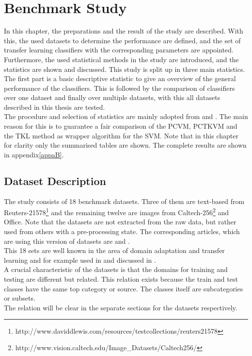 \chapter{Benchmark Study}\label{EmChap}
In this chapter, the preparations and the result of the study are described.
With this, the used datasets to determine the performance are defined, and the set of transfer learning classifiers with the corresponding parameters are appointed.\\
Furthermore, the used statistical methods in the study are introduced, and the statistics are shown and discussed.
This study is split up in three main statistics.
The first part is a basic descriptive statistic to give an overview of the general performance of the classifiers.
This is followed by the comparison of classifiers over one dataset and finally over multiple datasets, with this all datasets described in this thesis are tested.\\
The procedure and selection of statistics are mainly adopted from \cite{Chen.2009} and \cite{Long.2015}.
The main reason for this is to guarantee a fair comparison of the \acs{PCVM}, \acs{PCTKVM} and the \acs{TKL} method as wrapper algorithm for the \acs{SVM}.
Note that in this chapter for clarity only the summarised tables are shown. The complete results are shown in appendix\ref{appaB}.

\section{Dataset Description}\label{EmSecDaDes}
The study consists of 18 benchmark datasets.
Three of them are text-based from Reuters-21578\footnote{http://www.daviddlewis.com/resources/testcollections/reuters21578} and the remaining twelve are images from Caltech-256\footnote{http://www.vision.caltech.edu/Image\_Datasets/Caltech256/ } and Office.
Note that the datasets are not extracted from the raw data, but rather used from others with a pre-processing state.
The corresponding articles, which are using this version of datasets are \cite{Gong.} and \cite{Long.2015}.
\\
This 18 sets are well known in the area of domain adaptation and transfer learning and for example used in 
\cite{Long.2015}\cite{Gong.}\cite{Fernando.}\cite{Long.}\cite{Dai.}\cite{Quattoni.} and discussed in \cite{Pan.2010}.\\
A crucial characteristic of the datasets is that the domains for training and testing are different but related.
This relation exists because the train and test classes have the same top category or source.
The classes itself are subcategories or subsets.\cite{JingGao.2008}\\
The relation will be clear in the separate sections for the datasets respectively.

